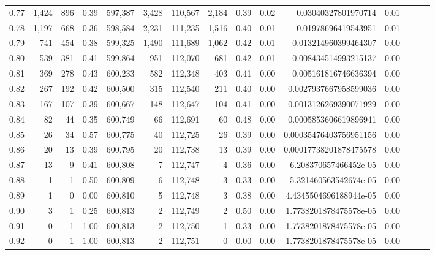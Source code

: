 \begin{tabular}{rrrrrrrrrrrrrrr}
0.77 &   1,424 &    896 &  0.39 &  597,387 &    3,428 &  110,567 &    2,184 &  0.39 &  0.02 &     0.03040327801970714 &      0.01 \\
0.78 &   1,197 &    668 &  0.36 &  598,584 &    2,231 &  111,235 &    1,516 &  0.40 &  0.01 &     0.01978696419543951 &      0.01 \\
0.79 &     741 &    454 &  0.38 &  599,325 &    1,490 &  111,689 &    1,062 &  0.42 &  0.01 &    0.013214960399464307 &      0.00 \\
0.80 &     539 &    381 &  0.41 &  599,864 &      951 &  112,070 &      681 &  0.42 &  0.01 &    0.008434514993215137 &      0.00 \\
0.81 &     369 &    278 &  0.43 &  600,233 &      582 &  112,348 &      403 &  0.41 &  0.00 &    0.005161816746636394 &      0.00 \\
0.82 &     267 &    192 &  0.42 &  600,500 &      315 &  112,540 &      211 &  0.40 &  0.00 &   0.0027937667958599036 &      0.00 \\
0.83 &     167 &    107 &  0.39 &  600,667 &      148 &  112,647 &      104 &  0.41 &  0.00 &   0.0013126269390071929 &      0.00 \\
0.84 &      82 &     44 &  0.35 &  600,749 &       66 &  112,691 &       60 &  0.48 &  0.00 &   0.0005853606619896941 &      0.00 \\
0.85 &      26 &     34 &  0.57 &  600,775 &       40 &  112,725 &       26 &  0.39 &  0.00 &  0.00035476403756951156 &      0.00 \\
0.86 &      20 &     13 &  0.39 &  600,795 &       20 &  112,738 &       13 &  0.39 &  0.00 &  0.00017738201878475578 &      0.00 \\
0.87 &      13 &      9 &  0.41 &  600,808 &        7 &  112,747 &        4 &  0.36 &  0.00 &   6.208370657466452e-05 &      0.00 \\
0.88 &       1 &      1 &  0.50 &  600,809 &        6 &  112,748 &        3 &  0.33 &  0.00 &   5.321460563542674e-05 &      0.00 \\
0.89 &       1 &      0 &  0.00 &  600,810 &        5 &  112,748 &        3 &  0.38 &  0.00 &  4.4345504696188944e-05 &      0.00 \\
0.90 &       3 &      1 &  0.25 &  600,813 &        2 &  112,749 &        2 &  0.50 &  0.00 &  1.7738201878475578e-05 &      0.00 \\
0.91 &       0 &      1 &  1.00 &  600,813 &        2 &  112,750 &        1 &  0.33 &  0.00 &  1.7738201878475578e-05 &      0.00 \\
0.92 &       0 &      1 &  1.00 &  600,813 &        2 &  112,751 &        0 &  0.00 &  0.00 &  1.7738201878475578e-05 &      0.00 \\

\end{tabular}

